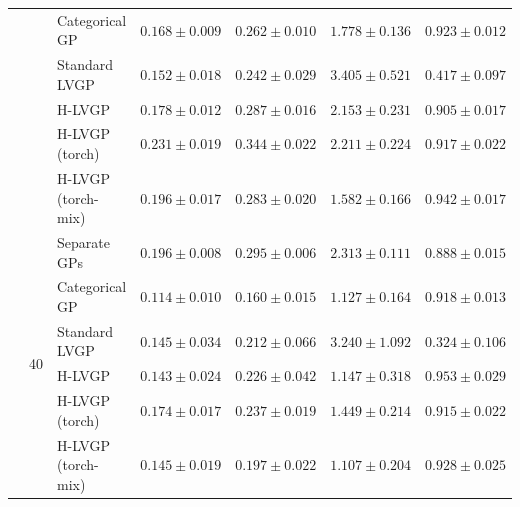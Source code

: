 \begin{table}[htbp]
\begin{tabular}{lllrrrr}
 &  & Categorical GP & $0.168 \pm 0.009$ & $0.262 \pm 0.010$ & $1.778 \pm 0.136$ & $0.923 \pm 0.012$ \\
 &  & Standard LVGP & \colorbox{green!20}{\boldmath$0.152 \pm 0.018$} & \colorbox{green!20}{\boldmath$0.242 \pm 0.029$} & $3.405 \pm 0.521$ & $0.417 \pm 0.097$ \\
 &  & H-LVGP & $0.178 \pm 0.012$ & $0.287 \pm 0.016$ & $2.153 \pm 0.231$ & $0.905 \pm 0.017$ \\
 &  & H-LVGP (torch) & $0.231 \pm 0.019$ & $0.344 \pm 0.022$ & $2.211 \pm 0.224$ & $0.917 \pm 0.022$ \\
 &  & H-LVGP (torch-mix) & $0.196 \pm 0.017$ & $0.283 \pm 0.020$ & \colorbox{green!20}{\boldmath$1.582 \pm 0.166$} & $0.942 \pm 0.017$ \\
\cmidrule(lr){2-7}
 & \multirow{6}{*}{40} & Separate GPs & $0.196 \pm 0.008$ & $0.295 \pm 0.006$ & $2.313 \pm 0.111$ & $0.888 \pm 0.015$ \\
 &  & Categorical GP & \colorbox{green!20}{\boldmath$0.114 \pm 0.010$} & \colorbox{green!20}{\boldmath$0.160 \pm 0.015$} & $1.127 \pm 0.164$ & $0.918 \pm 0.013$ \\
 &  & Standard LVGP & $0.145 \pm 0.034$ & $0.212 \pm 0.066$ & $3.240 \pm 1.092$ & $0.324 \pm 0.106$ \\
 &  & H-LVGP & $0.143 \pm 0.024$ & $0.226 \pm 0.042$ & $1.147 \pm 0.318$ & \colorbox{green!20}{\boldmath$0.953 \pm 0.029$} \\
 &  & H-LVGP (torch) & $0.174 \pm 0.017$ & $0.237 \pm 0.019$ & $1.449 \pm 0.214$ & $0.915 \pm 0.022$ \\
 &  & H-LVGP (torch-mix) & $0.145 \pm 0.019$ & $0.197 \pm 0.022$ & \colorbox{green!20}{\boldmath$1.107 \pm 0.204$} & $0.928 \pm 0.025$ \\
\bottomrule
\end{tabular}
\end{table}
